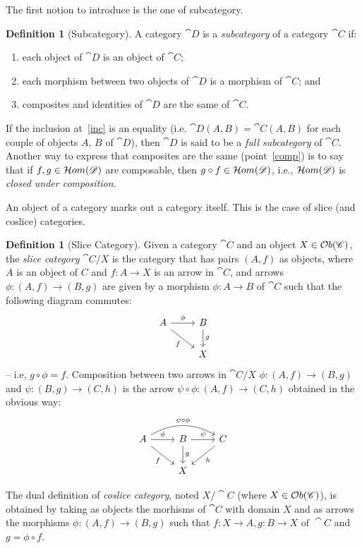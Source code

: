 \documentclass[a4paper, twoside,openright]{report}
\theoremstyle{plain}
\theoremstyle{definition}
\newtheorem{definition}[theorem]{Definition}
\begin{document}
The first notion to introduce is the one of subcategory.

\begin{definition}[Subcategory]
    A category $\cat{D}$ is a \emph{subcategory} of a category $\cat{C}$ if:
    \begin{enumerate}
        \item each object of $\cat{D}$ is an object of $\cat{C}$;
        \item \label{inc} each morphism between two objects of $\cat{D}$ is a morphism of $\cat{C}$; and
        \item \label{comp} composites and identities of $\cat{D}$ are the same of $\cat{C}$.
    \end{enumerate}

    If the inclusion at~\ref{inc} is an equality (i.e. $\cat{D}(A, B) = \cat{C}(A, B)$ for each couple of objects $A$, $B$ of $\cat{D}$), then $\cat{D}$ is said to be a \emph{full subcategory} of $\cat{C}$.
    Another way to express that composites are the same (point~\ref{comp}) is to say that if $f, g \in \mathcal{H}om(\mathscr{D})$ are composable, then $g \circ f \in \mathcal{H}om(\mathscr{D})$, i.e., $\mathcal{H}om(\mathscr{D})$ is \emph{closed under composition}.
\end{definition}

An object of a category marks out a category itself. This is the case of slice (and coslice) categories.

\begin{definition}[Slice Category]\label{def:slice_cat}
    Given a category $\cat{C}$ and an object $X \in \mathcal{O}b(\mathscr{C})$, the \emph{slice category} $\cat{C}/X$ is the category that has pairs $(A, f)$ as objects, where $A$ is an object of $C$ and $f: A \rightarrow X$ is an arrow in $\cat{C}$, and arrows $\phi: (A, f) \rightarrow (B, g)$ are given by a morphism $\phi: A \rightarrow B$ of $\cat{C}$ such that the following diagram commutes:
    \[
        \begin{tikzcd}
            A \arrow[r, "{\phi}"] \arrow[dr, "f" swap] & B \arrow[d, "g"] \\
            & X
        \end{tikzcd}
    \]
    -- i.e, $g \circ \phi = f$.
    Composition between two arrows in $\cat{C}/X$ $\phi: (A, f) \rightarrow (B, g)$ and $\psi: (B, g) \rightarrow (C, h)$ is the arrow $\psi \circ \phi : (A, f) \rightarrow (C, h)$ obtained in the obvious way:
    \[
        \begin{tikzcd}
            A \arrow[bend left=30]{rr}{\psi \circ \phi}  \arrow[r, "{\phi}"] \arrow[dr, "f" swap] & B \arrow[r, "{\psi}"] \arrow[d, "g"] & C \arrow[dl, "h"] \\
            & X & 
        \end{tikzcd}
    \]

    The dual definition of \emph{coslice category}, noted $X/\cat{C}$ (where $X \in \mathcal{O}b(\mathscr{C})$), is obtained by taking as objects the morhisms of $\cat{C}$ with domain $X$ and as arrows the morphisms $\phi: (A, f) \rightarrow (B, g)$ such that $f:X\rightarrow A, g:B \rightarrow X \text{ of }\cat{C}$ and $g = \phi \circ f$. 
\end{definition}
\end{document}
